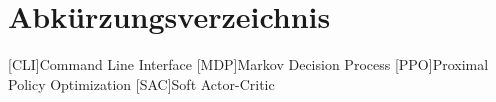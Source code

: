 \chapter*{Abkürzungsverzeichnis}

\begin{acronym}[PPO] %

	[CLI]{Command Line Interface}
	[MDP]{Markov Decision Process}
	[PPO]{Proximal Policy Optimization}
	[SAC]{Soft Actor-Critic}

\end{acronym}